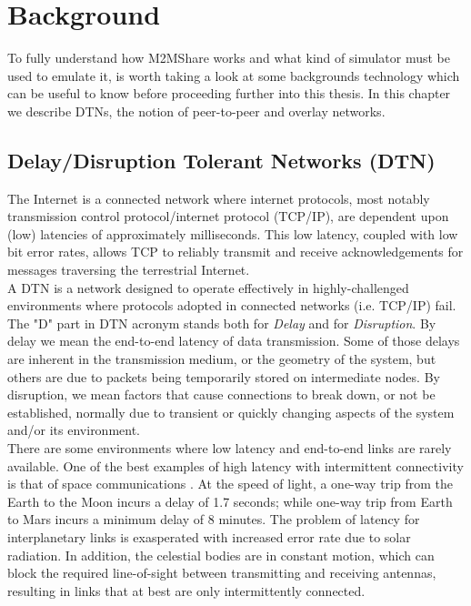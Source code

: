
\chapter{Background}\label{background} %





To fully understand how M2MShare works and what kind of simulator must be used to emulate it, is worth taking a look at some backgrounds technology which can be useful to know before proceeding further into this thesis. In this chapter we describe DTNs, the notion of peer-to-peer and overlay networks.

\section{Delay/Disruption Tolerant Networks (DTN)}
The Internet is a connected network where internet protocols, most notably transmission control protocol/internet protocol (TCP/IP), are dependent upon (low) latencies of approximately milliseconds. This low latency, coupled with low bit error rates, allows TCP to reliably transmit and receive acknowledgements for messages traversing the terrestrial Internet. 
\\

A DTN is a network designed to operate effectively in highly-challenged environments where protocols adopted in connected networks (i.e. TCP/IP) fail. The "D" part in DTN acronym stands both for \textit{Delay} and for \textit{Disruption}. By delay we mean the end-to-end latency of data transmission. Some of those delays are inherent in the transmission medium, or the geometry of the system, but others are due to packets being temporarily stored on intermediate nodes. By disruption, we mean factors that cause connections to break down, or not be established, normally due to transient or quickly changing aspects of the system and/or its environment.
\\

There are some environments where low latency and end-to-end links are rarely available. One of the best examples of high latency with intermittent connectivity is that of space communications \cite{Burleigh2003365}. At the speed of light, a one-way trip from the Earth to the Moon incurs a delay of 1.7 seconds; while one-way trip from Earth to Mars incurs a minimum delay of 8 minutes. The problem of latency for interplanetary links is exasperated with increased error rate due to solar radiation. In addition, the celestial bodies are in constant motion, which can block the required line-of-sight between transmitting and receiving antennas, resulting in links that at best are only intermittently connected. 
\\


